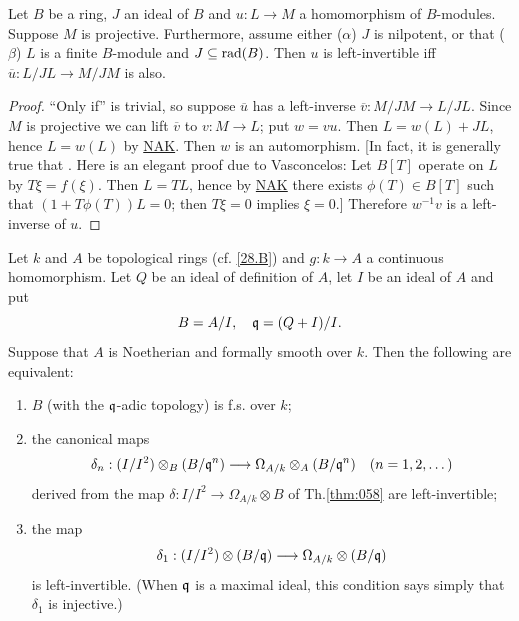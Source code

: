 \documentclass[../main]{subfiles}
\begin{document}
\begin{lemma}
\label{lem:29.2}
Let $B$ be a ring, $J$ an ideal of $B$ and $u : L \longrightarrow M$ a homomorphism of $B$-modules. Suppose $M$ is projective. Furthermore, assume either ($\alpha$) $J$ is nilpotent, or that ($\beta$) $L$ is a finite $B$-module and $J \subseteq \operatorname{rad}(B)$. Then $u$ is left-invertible iff $\overline u : L/JL \longrightarrow M/JM$ is also. 
\end{lemma}

\begin{proof}
``Only if'' is trivial, so suppose $\overline u$ has a left-inverse $\overline v : M/JM \longrightarrow L/JL$. Since $M$ is projective we can lift $\overline v$ to $v : M \longrightarrow L$; put $w = vu$. Then $L = w(L) + JL$, hence $L = w(L)$ by \hyperref[NAK]{NAK}. Then $w$ is an automorphism. [In fact, it is generally true that . Here is an elegant proof due to Vasconcelos: Let $B[T]$ operate on $L$ by $T \xi = f(\xi)$. Then $L = TL$, hence by \hyperref[NAK]{NAK} there exists $\phi(T) \in B[T]$ such that $(1 + T \phi(T))L = 0$; then $T \xi = 0$ implies $\xi = 0$.] Therefore $w^{-1}v$ is a left-inverse of $u$. 
\end{proof}

\begin{partheorem}
\label{thm:063}
Let $k$ and $A$ be topological rings (cf. \ref{28.B}) and $g : k \longrightarrow A$ a continuous homomorphism. Let $Q$ be an ideal of definition of $A$, let $I$ be an ideal of $A$ and put
\[
B = A/I, \quad \mathfrak{q} = (Q + I)/I.
\]
Suppose that $A$ is Noetherian and formally smooth over $k$. Then the following are equivalent: 

\begin{enumerate}
    \item[(1)] $B$ (with the $\mathfrak{q}$-adic topology) is f.s. over $k$;
    \item[(2)] the canonical maps \[\delta_n : (I/I^2) \otimes_B (B/{\mathfrak{q}}^n) \longrightarrow \Omega_{A/k} \otimes_A (B/{\mathfrak{q}}^n) \quad (n = 1, 2, \dots)\] derived from the map $\delta : I/I^2 \longrightarrow \Omega_{A/k} \otimes B$ of Th.\ref{thm:058} are left-invertible;
    \item[(3)] the map \[\delta_1 : (I/I^2) \otimes (B/\mathfrak{q}) \longrightarrow \Omega_{A/k} \otimes (B/\mathfrak{q})\] is left-invertible. (When $\mathfrak{q}$ is a maximal ideal, this condition says simply that $\delta_1$ is injective.)
\end{enumerate}
\end{partheorem}
\end{document}
